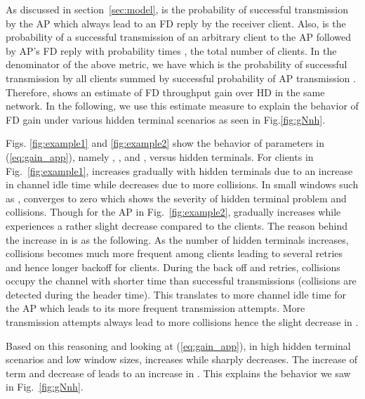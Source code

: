 \documentclass[10pt,journal,cspaper,compsoc]{IEEEtran}
\begin{document}
As discussed in section~\ref{sec:model},  is the probability of successful transmission by the AP which always lead to an FD reply by the receiver client. Also,  is the probability of a successful transmission of an arbitrary client to the AP followed by AP's FD reply with probability  times , the total number of clients. In the denominator of the above metric, we have  which is the probability of successful transmission by all clients summed by successful probability of AP transmission . Therefore,   shows an estimate of FD throughput gain over HD in the same network. In the following, we use this estimate measure to explain the behavior of FD gain under various hidden terminal scenarios as seen in Fig.\ref{fig:gNnh}.

Figs. \ref{fig:example1} and \ref{fig:example2} show the behavior of parameters in (\ref{eq:gain_app}), namely , ,  and , versus hidden terminals. For clients in Fig.~\ref{fig:example1},  increases gradually with hidden terminals due to an increase in channel idle time while  decreases due to more collisions. In small windows such as ,  converges to zero which shows the severity of hidden terminal problem and collisions. Though for the AP in Fig.~\ref{fig:example2},  gradually increases while  experiences a rather slight decrease compared to the clients. The reason behind the increase in  is as the following. As the number of hidden terminals increases, collisions becomes much more frequent among clients leading to several retries and hence longer backoff for clients. During the back off and retries, collisions occupy the channel with shorter time than successful transmissions (collisions are detected during the header time). This translates to more channel idle time for the AP which leads to its more frequent transmission attempts. More transmission attempts always lead to more collisions hence the slight decrease in .

Based on this reasoning and looking at (\ref{eq:gain_app}), in high hidden terminal scenarios and low window sizes,  increases while  sharply decreases. The increase of term  and decrease of  leads to an increase in . This explains the behavior we saw in Fig.~\ref{fig:gNnh}.       

\begin{figure*}\centering
	\qquad
	\centering
	\caption{The effect of hidden terminals on  and }\label{fig:example1}\end{figure*}
\end{document}

